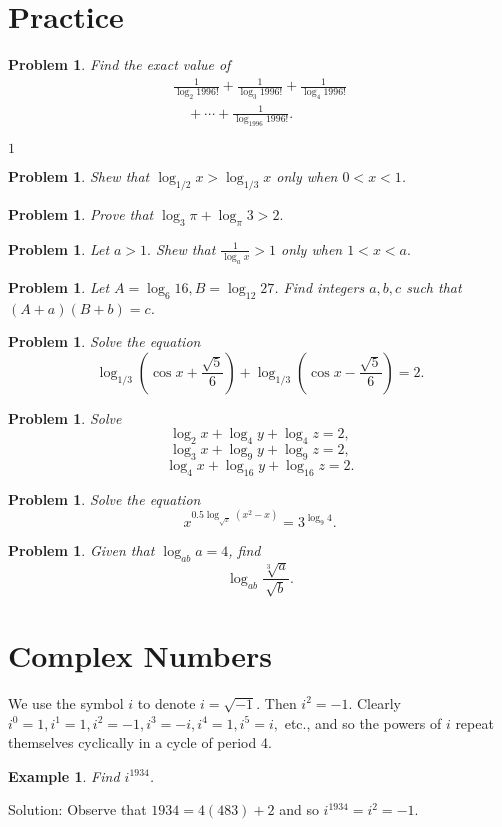 \documentclass[11pt, openany]{book}
\theoremstyle{change} \theoremheaderfont{\blue\sffamily\bfseries}
\newtheorem{exa}[thm]{Example}
\newtheorem{pro}[thm]{Problem}
\theoremstyle{nonumberplain} \theoremheaderfont{\sffamily\bfseries}
\newcommand{\dis}{\displaystyle}
\newcommand{\í}{\'{\i}}
\begin{document}
\section*{Practice}\begin{multicols}{2}\columnseprule 1pt \columnsep 25pt

\begin{pro} Find the exact value of
$$\begin{array}{l}\frac{1}{\log _2 1996!} + \frac{1}{\log _3 1996!} +\frac{1}{\log _4 1996!}\\ \quad +
\cdots + \frac{1}{\log _{1996} 1996!}.\end{array}$$
\begin{answer}
$1$

\end{answer}
\end{pro}
\begin{pro}
Shew that $\dis{\log _{1/2} x > \log _{1/3} x}$ only when $0 < x <
1$.
\end{pro}
\begin{pro}
Prove that $\log _3 \pi + \log _\pi 3 > 2.$
\end{pro}
\begin{pro}
Let $a > 1.$ Shew that $\dis{\frac{1}{\log _a x} > 1}$ only when
$1 < x < a.$
\end{pro}
\begin{pro}
Let $A = \log _6 16, B = \log _{12} 27$. Find integers $a, b, c$
such that $(A + a)(B + b) = c$.
\end{pro}
\begin{pro} Solve the equation
$$\log _{1/3}\left( \cos x + \frac{\sqrt{5}}{6}\right) + \log _{1/3} \left(\cos x - \frac{\sqrt{5}}{6}\right) = 2.$$\end{pro}
\begin{pro} Solve
$$\log _2 x + \log _4 y + \log _4 z = 2,$$
$$\log _3 x + \log _9 y + \log _9 z = 2,$$
$$\log _4 x + \log _{16} y + \log _{16} z = 2.$$
\end{pro}
\begin{pro} Solve the equation
$$x^{0.5\log _{\sqrt{x}} (x^2 - x)} = 3^{\log _9 4}.$$\end{pro}
\begin{pro}
Given that $\log _{ab} a = 4$, find
$$\log _{ab} \frac{\sqrt[3]{a}}{\sqrt{b}}.$$
\end{pro}\end{multicols}
\section{Complex Numbers} We use the symbol $i$ to
denote $i = \sqrt{-1}$. Then $i^2 = -1.$ Clearly $i^0 = 1, i^1 =
1, i^2 = -1, i^3 = -i, i^4 = 1, i^5 = i,$ etc., and so the powers
of $i$ repeat themselves cyclically in a cycle of period 4.
\begin{exa}
Find $i^{1934}$.
\end{exa}
Solution: Observe that $1934 = 4(483) + 2$ and so $i^{1934} = i^2
= -1$.
\end{document}
